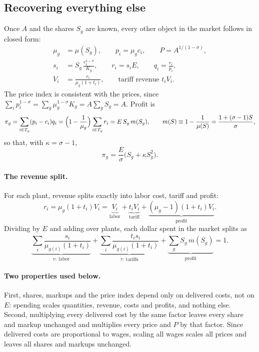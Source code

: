 \documentclass[11pt]{article}
\begin{document}
\subsection{Recovering everything else}

Once $A$ and the shares $S_g$ are known, every other object in the market follows in
closed form:
\begin{align}
  \mu_g&=\mu(S_g),\qquad p_i=\mu_gc_i,\qquad P=A^{1/(1-\sigma)},
  \label{eq:recover1}\\
  s_i&=S_g\,\frac{c_i^{1-\sigma}}{K_g},\qquad r_i=s_iE,\qquad q_i=\frac{r_i}{p_i},
  \label{eq:recover2}\\
  V_i&=\frac{r_i}{\mu_g(1+t_i)},\qquad \text{tariff revenue } t_iV_i .
  \label{eq:recover3}
\end{align}
The price index is consistent with the prices, since
$\sum_ip_i^{1-\sigma}=\sum_g\mu_g^{1-\sigma}K_g=A\sum_gS_g=A$. Profit is
\[
  \pi_g=\sum_{i\in T_g}(p_i-c_i)q_i=\Bigl(1-\frac{1}{\mu_g}\Bigr)\sum_{i\in T_g}r_i
  =E\,S_g\,m(S_g),
  \qquad
  m(S)\equiv1-\frac{1}{\mu(S)}=\frac{1+(\sigma-1)S}{\sigma},
\]
so that, with $\kappa=\sigma-1$,
\begin{equation}
  \pi_g=\frac{E}{\sigma}\bigl(S_g+\kappa S_g^2\bigr).
  \label{eq:profit}
\end{equation}

\paragraph{The revenue split.} For each plant, revenue splits exactly into labor cost,
tariff and profit:
\begin{equation}
  r_i=\mu_g(1+t_i)V_i=\underbrace{V_i}_{\text{labor}}
  +\underbrace{t_iV_i}_{\text{tariff}}
  +\underbrace{(\mu_g-1)(1+t_i)V_i}_{\text{profit}} .
  \label{eq:revid}
\end{equation}
Dividing by $E$ and adding over plants, each dollar spent in the market splits as
\begin{equation}
  \underbrace{\sum_i\frac{s_i}{\mu_{g(i)}(1+t_i)}}_{v:\ \text{labor}}
  +\underbrace{\sum_i\frac{t_is_i}{\mu_{g(i)}(1+t_i)}}_{\tau:\ \text{tariffs}}
  +\underbrace{\sum_gS_g\,m(S_g)}_{\text{profit}}=1 .
  \label{eq:perdollar}
\end{equation}

\paragraph{Two properties used below.} First, shares, markups and the price index
depend only on delivered costs, not on $E$: spending scales quantities, revenue, costs
and profits, and nothing else. Second, multiplying every delivered cost by the same
factor leaves every share and markup unchanged and multiplies every price and $P$ by
that factor. Since delivered costs are proportional to wages, scaling all wages scales
all prices and leaves all shares and markups unchanged.
\end{document}
